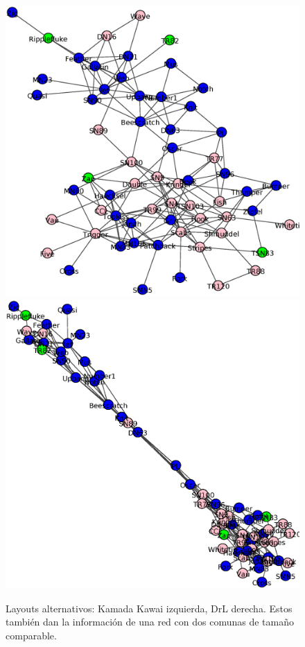 \begin{figure}
\centering
\includegraphics[scale = 0.25]{figuras/KamKaw.eps}
\includegraphics[scale = 0.25]{figuras/Drl.eps}
\caption{Layouts alternativos: Kamada Kawai izquierda, DrL derecha. Estos también dan la información de una red con dos comunas de tamaño comparable.}
\label{fig:Layouts_alternativos}
\end{figure}

